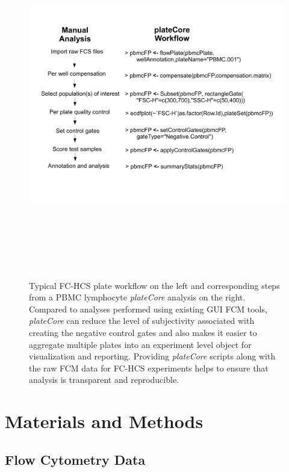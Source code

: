 \documentclass[12pt]{article}
\newcommand{\Rpackage}[1]{{\textit{#1}}}
\begin{document}
\begin{figure}
\centering
\includegraphics[width=7in,height=6in]{analysisSteps.pdf}
\caption{Typical FC-HCS plate workflow on the left and corresponding steps from
a PBMC lymphocyte \Rpackage{plateCore} analysis on the right. Compared to
analyses performed using existing GUI FCM tools, \Rpackage{plateCore} can
reduce the level of subjectivity associated with creating the negative control
gates and also makes it easier to aggregate multiple plates into an experiment
level object for visualization and reporting. Providing \Rpackage{plateCore}
scripts along with the raw FCM data for FC-HCS experiments helps to ensure that
analysis is transparent and reproducible.}
\label{fig:analysis}
\end{figure}
 
\clearpage
\section*{Materials and Methods}
\subsection*{Flow Cytometry Data}
\end{document}
